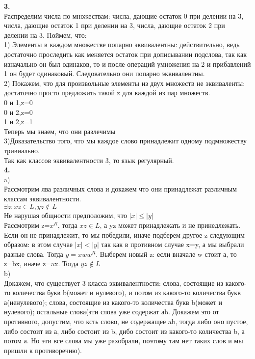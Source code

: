 \documentclass[a4paper,12pt]{article}
\begin{document}
\textbf{3.}\\
Распределим числа по множествам: числа, дающие остаток 0 при делении на 3, числа, дающие остаток 1 при делении на 3, числа, дающие остаток 2 при делении на 3. Поймем, что:\\
1) Элементы в каждом множестве попарно эквивалентны: действительно, ведь достаточно проследить как меняется остаток при дописывании подслова, так как изначально он был одинаков, то и после операций умножения на 2 и прибавлений 1 он будет одинаковый. Следовательно они попарно эквивалентны.\\
2) Покажем, что для произвольные элементы из двух множеств не эквиваленты: достаточно просто предложить такой z для каждой из пар множеств. \\
0 и 1,z=0\\
0 и 2,z=0\\
1 и 2,z=1\\
Теперь мы знаем, что они разлечимы\\
3)Доказательство того, что мы каждое слово принадлежит одному подмножеству тривиально.\\
Так как классов эквивалентности 3, то язык регулярный.\\
\textbf{4.}\\
a)\\
Рассмотрим лва различных слова и докажем что они принадлежат различным классам эквивалентности.\\
$\exists z: xz \in L,yz \notin L$\\
Не нарушая общности предположим, что $|x| \leq |y|$\\
Рассмотрим z=$x^R$, тогда $xz \in L$, а yz может принадлежать и не принедлежать. Если он не принадлежит, то мы победили, иначе подберем другое z следующим образом: в этом случае $|x| < |y|$ так как в противном случае x=y, а мы выбрали разные слова. Тогда $y=xww^R$. Выберем новый z: если вначале w стоит а, то z=bx, иначе z=ax. Тогда $yz \notin L$\\
b)\\
Докажем, что существует 3 класса эквивалентности: слова, состоящие из какого-то количества букв b(может и нулевого), и потом из какого-то количества букв а(ненулевого); слова, состоящие из какого-то количества букв b(может и нулевого);
остальные слова(эти слова уже содержат аb. Докажем это от противного, допустим, что ксть слово, не содержащее ab, тогда либо оно пустое, либо состоит из а, либо состоит из b, дибо состоит из какого-то количества b, а потом а. Но эти все слова мы уже рахобрали, поэтому там нет таких слов и мы пришли к противоречию). \\
\end{document}
